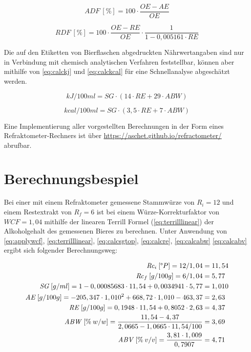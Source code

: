 \documentclass[a4paper,parskip=half]{scrartcl}
\newcommand{\bxi}{\mathit{R}_i}
\newcommand{\bxic}{\mathit{Rc}_i}
\newcommand{\bxf}{\mathit{R}_f}
\newcommand{\bxfc}{\mathit{Rc}_f}
\newcommand{\sg}{\mathit{SG}}
\newcommand{\abv}{\mathit{ABV}}
\newcommand{\abw}{\mathit{ABW}}
\newcommand{\oex}{\mathit{OE}}
\newcommand{\aex}{\mathit{AE}}
\newcommand{\rex}{\mathit{RE}}
\newcommand{\wcf}{\mathit{WCF}}
\newcommand{\adf}{\mathit{ADF}}
\newcommand{\rdf}{\mathit{RDF}}
\begin{document}
\begin{equation}
\adf\:[\%]= 100 \cdot \frac{\oex - \aex}{\oex}
\label{eq:calcadf}
\end{equation}

\begin{equation}
\rdf\:[\%] = 100 \cdot \frac{\oex - \rex}{\oex} \cdot \frac{1}{1 - 0,005161 \cdot \rex}
\label{eq:calcrdf}
\end{equation}

Die auf den Etiketten von Bierflaschen abgedruckten Nährwertangaben sind
nur in Verbindung mit chemisch analytischen Verfahren feststellbar,
können aber mithilfe von \autoref{eq:calckj} und \autoref{eq:calckcal}
für eine Schnellanalyse abgeschätzt werden. \autocite{MEBAK2013} 

\begin{equation}
kJ/100ml = \sg \cdot (14 \cdot \rex + 29 \cdot \abw)
\label{eq:calckj}
\end{equation}

\begin{equation}
kcal/100ml = \sg \cdot (3,5 \cdot \rex + 7 \cdot \abw)
\label{eq:calckcal}
\end{equation}

Eine Implementierung aller vorgestellten Berechnungen in der Form eines
Refraktometer-Rechners ist über \url{https://aschet.github.io/refractometer/}
abrufbar.

\section*{Berechnungsbespiel}

Bei einer mit einem Refraktometer gemessene Stammwürze von $\bxi = 12$
und einem Restextrakt von $\bxf = 6$ ist bei einem Würze-Korrekturfaktor
von $\wcf = 1,04$ mithilfe der linearen Terrill Formel
(\autoref{eq:terrilllinear}) der Alkoholgehalt des gemessenen Bieres
zu berechnen. Unter Anwendung von \autoref{eq:applywcf},
\autoref{eq:terrilllinear}, \autoref{eq:calcsgtop},
\autoref{eq:calcre}, \autoref{eq:calcabw} \autoref{eq:calcabv} ergibt
sich folgender Berechnungsweg:

\begin{align*}
\bxic\:[\degree P] = 12 / 1,04 &= 11,54 \\
\bxfc\:[g/100g] = 6 / 1,04 &= 5,77 \\
\sg\:[g/ml] = 1 - 0,00085683 \cdot 11,54 + 0,0034941 \cdot 5,77 &= 1,010 \\
\aex\:[g/100g] = -205,347 \cdot 1,010^2 + 668,72 \cdot 1,010 - 463,37 &= 2,63 \\
\rex\:[g/100g] = 0,1948 \cdot 11,54 + 0,8052 \cdot 2,63 &= 4,37 \\
\abw\:[\%\:w/w] = \frac{11,54 - 4,37}{2,0665 - 1,0665 \cdot 11,54 / 100} &= 3,69 \\
\abv\:[\%\:v/v] = \frac{3,81 \cdot 1,009}{0,7907} &= 4,71
\end{align*}
\end{document}
